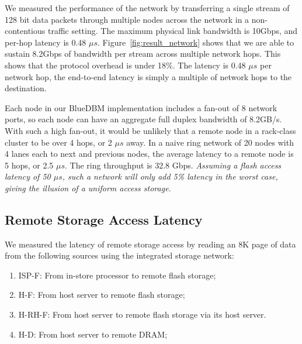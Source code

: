 We measured the performance of the network by transferring a single stream of 128 bit data packets through multiple nodes across the network in a non-contentious traffic setting. The maximum physical link bandwidth is 10Gbps, and per-hop latency is 0.48 $\mu s$.
Figure~\ref{fig:result_network} shows that we are able to sustain 8.2Gbps of bandwidth per stream across multiple network hops. This shows that the protocol overhead is under 18\%. The latency is 0.48 $\mu s$ per network hop, the end-to-end latency is simply a multiple of network hops to the destination. 

Each node in our BlueDBM implementation includes a fan-out of 8 network ports,
so each node can have an aggregate full duplex bandwidth of 8.2GB/s. With such a
high fan-out, it would be unlikely that a remote node in a rack-class cluster to
be over 4 hops, or 2 $\mu s$ away. In a naive ring network of 20 nodes with 4
lanes each to next and previous nodes, the average latency to a remote node is 5
hops, or 2.5 $\mu s$. The ring throughput is 32.8 Gbps. \emph{Assuming a flash
access latency of 50 $\mu s$, such a network will only add 5\% latency in the
worst case, giving the illusion of a uniform access storage.}



\subsection{Remote Storage Access Latency}
\label{sec:latency}

We measured the latency of remote storage access by reading an 8K page of data from the following sources using the integrated storage network: 

\begin{enumerate}
\item ISP-F: From in-store processor to remote flash storage;
\item H-F: From host server to remote flash storage;
\item H-RH-F: From host server to remote flash storage via its host server.
\item H-D: From host server to remote DRAM; 
\end{enumerate}

